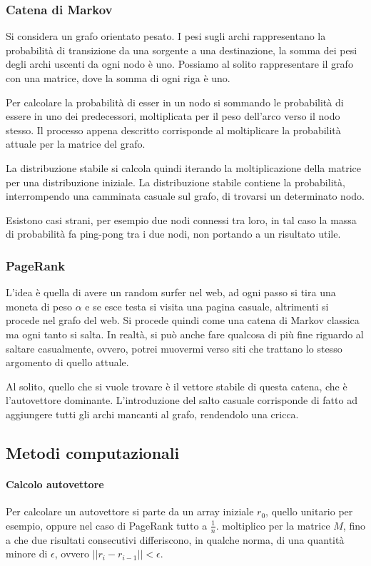 \subsubsection{Catena di Markov}
Si considera un grafo orientato pesato. I pesi sugli archi rappresentano la probabilità 
di transizione da una sorgente a una destinazione, la somma dei pesi degli archi 
uscenti da ogni nodo è uno.
Possiamo al solito rappresentare il grafo con una matrice, dove la somma di ogni riga 
è uno.

Per calcolare la probabilità di esser in un nodo si sommando le probabilità di 
essere in uno dei predecessori, moltiplicata per il peso dell'arco verso il nodo stesso.
Il processo appena descritto corrisponde al moltiplicare la probabilità attuale 
per la matrice del grafo.

La distribuzione stabile si calcola quindi iterando la moltiplicazione della matrice 
per una distribuzione iniziale. La distribuzione stabile contiene
la probabilità, interrompendo una camminata casuale sul grafo, di trovarsi un determinato 
nodo. 

Esistono casi strani, per esempio due nodi connessi tra loro, in tal caso 
la massa di probabilità fa ping-pong tra i due nodi, non portando a un risultato 
utile.

\subsubsection{PageRank}
L'idea è quella di avere un random surfer nel web, ad ogni passo si tira una 
moneta di peso $\alpha$ e se esce testa si visita una pagina casuale, 
altrimenti si procede nel grafo del web.
Si procede quindi come una catena di Markov classica ma ogni tanto si salta.
In realtà, si può anche fare qualcosa di più fine riguardo al saltare casualmente, 
ovvero, potrei muovermi verso siti che trattano lo stesso argomento di quello
attuale.

Al solito, quello che si vuole trovare è il vettore stabile di questa catena, 
che è l'autovettore dominante.
L'introduzione del salto casuale corrisponde di fatto ad aggiungere tutti gli archi 
mancanti al grafo, rendendolo una cricca.

\subsection{Metodi computazionali}

\paragraph{Calcolo autovettore}
Per calcolare un autovettore si parte da un array iniziale $r_0$, quello unitario per esempio, 
oppure nel caso di PageRank tutto a $\frac{1}{n}$. moltiplico per la matrice $M$, fino 
a che due risultati consecutivi differiscono, in qualche norma, di una quantità minore 
di $\epsilon$, ovvero $||r_{i} - r_{i-1}|| < \epsilon$.

